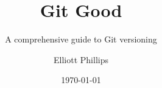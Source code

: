 \title{Git Good}
\subtitle{A comprehensive guide to Git versioning}
\author{Elliott Phillips}
\date{\today}

\frontpage

%
{ %
	\makeatletter
		\@twosidetrue
		\@openrighttrue
	\makeatother
	
	\ifodd\thepage\relax\else\blankpage\fi
	
	
	\setcounter{page}{1}
}







%
